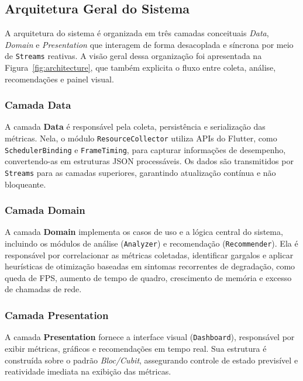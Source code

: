 \subsection{Arquitetura Geral do Sistema}

A arquitetura do sistema é organizada em três camadas conceituais \textit{Data}, \textit{Domain} e \textit{Presentation} que interagem de forma desacoplada e síncrona por meio de \texttt{Streams} reativas.
A visão geral dessa organização foi apresentada na Figura~\ref{fig:architecture}, que também explicita o fluxo entre coleta, análise, recomendações e painel visual.

\subsubsection{Camada Data}

A camada \textbf{Data} é responsável pela coleta, persistência e serialização das métricas.
Nela, o módulo \texttt{ResourceCollector} utiliza APIs do Flutter, como \texttt{SchedulerBinding} e \texttt{FrameTiming}, para capturar informações de desempenho, convertendo-as em estruturas JSON processáveis.
Os dados são transmitidos por \texttt{Streams} para as camadas superiores, garantindo atualização contínua e não bloqueante.

\subsubsection{Camada Domain}

A camada \textbf{Domain} implementa os casos de uso e a lógica central do sistema, incluindo os módulos de análise (\texttt{Analyzer}) e recomendação (\texttt{Recommender}).
Ela é responsável por correlacionar as métricas coletadas, identificar gargalos e aplicar heurísticas de otimização baseadas em sintomas recorrentes de degradação, como queda de FPS, aumento de tempo de quadro, crescimento de memória e excesso de chamadas de rede.

\subsubsection{Camada Presentation}

A camada \textbf{Presentation} fornece a interface visual (\texttt{Dashboard}), responsável por exibir métricas, gráficos e recomendações em tempo real.
Sua estrutura é construída sobre o padrão \textit{Bloc/Cubit}, assegurando controle de estado previsível e reatividade imediata na exibição das métricas.

